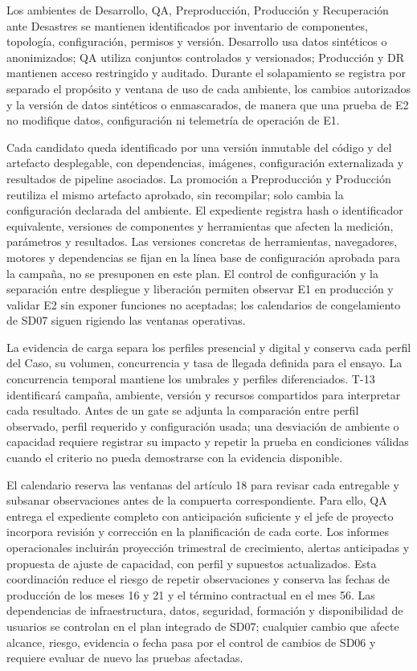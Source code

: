 \documentclass[11pt]{article}
\begin{document}
Los ambientes de Desarrollo, QA, Preproducción, Producción y Recuperación ante Desastres se mantienen identificados por inventario de componentes, topología, configuración, permisos y versión. Desarrollo usa datos sintéticos o anonimizados; QA utiliza conjuntos controlados y versionados; Producción y DR mantienen acceso restringido y auditado. Durante el solapamiento se registra por separado el propósito y ventana de uso de cada ambiente, los cambios autorizados y la versión de datos sintéticos o enmascarados, de manera que una prueba de E2 no modifique datos, configuración ni telemetría de operación de E1.

Cada candidato queda identificado por una versión inmutable del código y del artefacto desplegable, con dependencias, imágenes, configuración externalizada y resultados de pipeline asociados. La promoción a Preproducción y Producción reutiliza el mismo artefacto aprobado, sin recompilar; solo cambia la configuración declarada del ambiente. El expediente registra hash o identificador equivalente, versiones de componentes y herramientas que afecten la medición, parámetros y resultados. Las versiones concretas de herramientas, navegadores, motores y dependencias se fijan en la línea base de configuración aprobada para la campaña, no se presuponen en este plan. El control de configuración y la separación entre despliegue y liberación permiten observar E1 en producción y validar E2 sin exponer funciones no aceptadas; los calendarios de congelamiento de SD07 siguen rigiendo las ventanas operativas.

La evidencia de carga separa los perfiles presencial y digital y conserva cada perfil del Caso, su volumen, concurrencia y tasa de llegada definida para el ensayo. La concurrencia temporal mantiene los umbrales y perfiles diferenciados. T-13 identificará campaña, ambiente, versión y recursos compartidos para interpretar cada resultado. Antes de un gate se adjunta la comparación entre perfil observado, perfil requerido y configuración usada; una desviación de ambiente o capacidad requiere registrar su impacto y repetir la prueba en condiciones válidas cuando el criterio no pueda demostrarse con la evidencia disponible.

El calendario reserva las ventanas del artículo 18 para revisar cada entregable y subsanar observaciones antes de la compuerta correspondiente. Para ello, QA entrega el expediente completo con anticipación suficiente y el jefe de proyecto incorpora revisión y corrección en la planificación de cada corte. Los informes operacionales incluirán proyección trimestral de crecimiento, alertas anticipadas y propuesta de ajuste de capacidad, con perfil y supuestos actualizados. Esta coordinación reduce el riesgo de repetir observaciones y conserva las fechas de producción de los meses 16 y 21 y el término contractual en el mes 56. Las dependencias de infraestructura, datos, seguridad, formación y disponibilidad de usuarios se controlan en el plan integrado de SD07; cualquier cambio que afecte alcance, riesgo, evidencia o fecha pasa por el control de cambios de SD06 y requiere evaluar de nuevo las pruebas afectadas.
\end{document}
